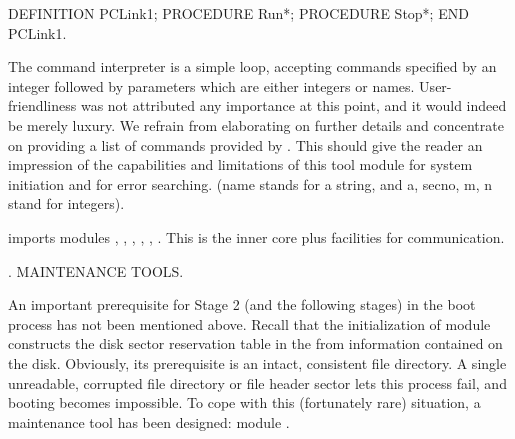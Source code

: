 DEFINITION PCLink1;
  PROCEDURE Run*;
  PROCEDURE Stop*;
END PCLink1.
\endtt

\noindent The command interpreter is a simple loop, accepting commands specified by an integer followed by parameters which are either integers or names. User-friendliness was not attributed any importance at this point, and it would indeed be merely luxury. We refrain from elaborating on further details and concentrate on providing a list of commands provided by . This should give the reader an impression of the capabilities and limitations of this tool module for system initiation and for error searching. (name stands for a string, and a, secno, m, n stand for integers).


\noindent {} imports modules , , , , , . This is the inner core plus facilities for communication.

. MAINTENANCE TOOLS.

An important prerequisite for Stage 2 (and the following stages) in the boot process has not been mentioned above. Recall that the initialization of module  constructs the disk sector reservation table in the  from information contained on the disk. Obviously, its prerequisite is an intact, consistent file directory. A single unreadable, corrupted file directory or file header sector lets this process fail, and booting becomes impossible. To cope with this (fortunately rare) situation, a maintenance tool has been designed: module .

